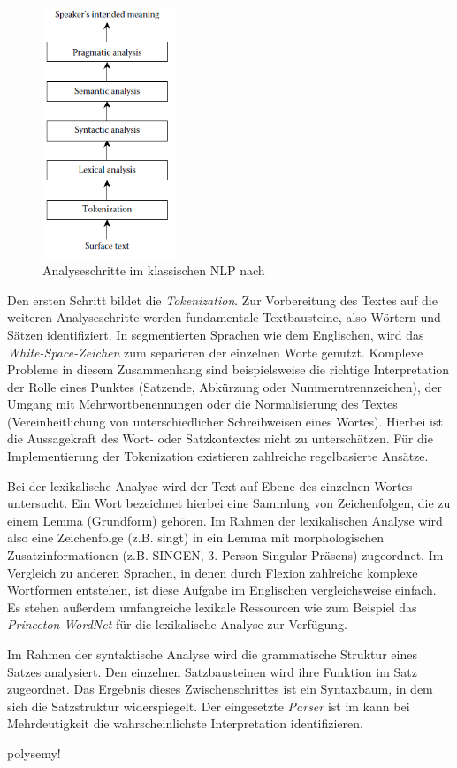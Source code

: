 \begin{figure}
\includegraphics[width=4cm]{pictures/Analyseschritte.png}
\caption{Analyseschritte im klassischen NLP nach \cite[vgl.][4]{DALE}}
\label{fig:STEPS}
\end{figure}
\par
Den ersten Schritt bildet die \textit{Tokenization}. Zur Vorbereitung des Textes auf die weiteren Analyseschritte werden fundamentale Textbausteine, also Wörtern und Sätzen identifiziert. In segmentierten Sprachen wie dem Englischen, wird das \textit{White-Space-Zeichen} zum separieren der einzelnen Worte genutzt. Komplexe Probleme in diesem Zusammenhang sind beispielsweise die richtige Interpretation der Rolle eines Punktes (Satzende, Abkürzung oder Nummerntrennzeichen), der Umgang mit Mehrwortbenennungen oder die Normalisierung des Textes (Vereinheitlichung von unterschiedlicher Schreibweisen eines Wortes). Hierbei ist die Aussagekraft des Wort- oder Satzkontextes nicht zu unterschätzen. Für die Implementierung der Tokenization existieren zahlreiche regelbasierte Ansätze.
\par
Bei der lexikalische Analyse wird der Text auf Ebene des einzelnen Wortes untersucht. Ein Wort bezeichnet hierbei eine Sammlung von Zeichenfolgen, die zu einem Lemma (Grundform) gehören. Im Rahmen der lexikalischen Analyse wird also eine Zeichenfolge (z.B. singt) in ein Lemma mit morphologischen Zusatzinformationen (z.B. SINGEN, 3. Person Singular Präsens) zugeordnet. Im Vergleich zu anderen Sprachen, in denen durch Flexion zahlreiche komplexe Wortformen entstehen, ist diese Aufgabe im Englischen vergleichsweise einfach. Es stehen außerdem umfangreiche lexikale Ressourcen wie zum Beispiel das \textit{Princeton WordNet} für die lexikalische Analyse zur Verfügung. 
\par
Im Rahmen der syntaktische Analyse wird die grammatische Struktur eines Satzes analysiert. Den einzelnen Satzbausteinen wird ihre Funktion im Satz zugeordnet. Das Ergebnis dieses Zwischenschrittes ist ein Syntaxbaum, in dem sich die Satzstruktur widerspiegelt. Der eingesetzte \textit{Parser} ist im kann bei Mehrdeutigkeit die wahrscheinlichste Interpretation identifizieren.
\par

polysemy!












